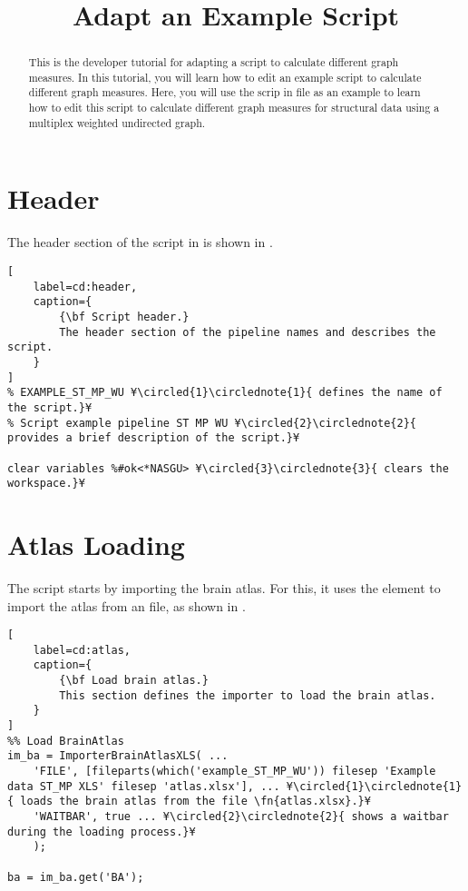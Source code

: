 \documentclass{tufte-handout}
\title{Adapt an Example Script}
\begin{document}
\maketitle

\begin{abstract}
\noindent
This is the developer tutorial for adapting a script to calculate different graph measures. In this tutorial, you will learn how to edit an example script to calculate different graph measures. Here, you will use the scrip in file  as an example to learn how to edit this script to calculate different graph measures for structural data using a multiplex weighted undirected graph.
\end{abstract}

\tableofcontents

\clearpage

\section{Header}

The header section of the script in  is shown in .

\begin{lstlisting}[
	label=cd:header,
	caption={
		{\bf Script header.}
		The header section of the pipeline names and describes the script.
	}
]
% EXAMPLE_ST_MP_WU ¥\circled{1}\circlednote{1}{ defines the name of the script.}¥
% Script example pipeline ST MP WU ¥\circled{2}\circlednote{2}{ provides a brief description of the script.}¥

clear variables %#ok<*NASGU> ¥\circled{3}\circlednote{3}{ clears the workspace.}¥
\end{lstlisting}

\section{Atlas Loading}

The script starts by importing the brain atlas. For this, it uses the element  to import the atlas from an  file, as shown in .
 
\begin{lstlisting}[
	label=cd:atlas,
	caption={
		{\bf Load brain atlas.}
		This section defines the importer to load the brain atlas.
	}
]
%% Load BrainAtlas
im_ba = ImporterBrainAtlasXLS( ...
    'FILE', [fileparts(which('example_ST_MP_WU')) filesep 'Example data ST_MP XLS' filesep 'atlas.xlsx'], ... ¥\circled{1}\circlednote{1}{ loads the brain atlas from the file \fn{atlas.xlsx}.}¥
    'WAITBAR', true ... ¥\circled{2}\circlednote{2}{ shows a waitbar during the loading process.}¥
    );

ba = im_ba.get('BA');
\end{lstlisting}
\end{document}
